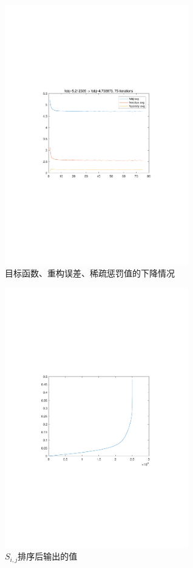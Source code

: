 \begin{figure}[H]
\centering
\includegraphics[width=8cm]{fig/128_22.pdf}
\caption{目标函数、重构误差、稀疏惩罚值的下降情况}
\end{figure}

\begin{figure}[H]
\centering
\includegraphics[width=8cm]{fig/128_32.pdf}
\caption{$S_{i,j}$排序后输出的值}
\label{fig3}
\end{figure}

